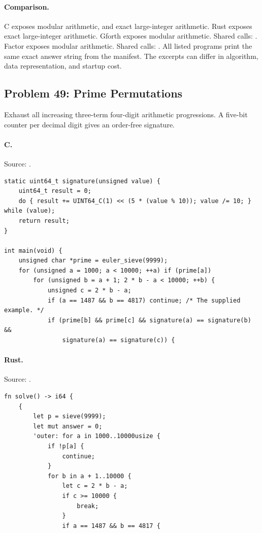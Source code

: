 \paragraph{Comparison.}
C exposes modular arithmetic, and exact large-integer arithmetic. Rust exposes exact large-integer arithmetic. Gforth exposes modular arithmetic. Shared calls: \texttt{}. Factor exposes modular arithmetic. Shared calls: \texttt{}.
All listed programs print the same exact answer string from the manifest. The excerpts can differ in algorithm, data representation, and startup cost.

\subsection{Problem 49: Prime Permutations}
\label{walkthrough:p49}
Exhaust all increasing three-term four-digit arithmetic progressions. A five-bit counter per decimal digit gives an order-free signature.

\paragraph{C.} Source: .
\begin{lstlisting}
static uint64_t signature(unsigned value) {
    uint64_t result = 0;
    do { result += UINT64_C(1) << (5 * (value % 10)); value /= 10; } while (value);
    return result;
}

int main(void) {
    unsigned char *prime = euler_sieve(9999);
    for (unsigned a = 1000; a < 10000; ++a) if (prime[a])
        for (unsigned b = a + 1; 2 * b - a < 10000; ++b) {
            unsigned c = 2 * b - a;
            if (a == 1487 && b == 4817) continue; /* The supplied example. */
            if (prime[b] && prime[c] && signature(a) == signature(b) &&
                signature(a) == signature(c)) {
\end{lstlisting}

\paragraph{Rust.} Source: .
\begin{lstlisting}
fn solve() -> i64 {
    {
        let p = sieve(9999);
        let mut answer = 0;
        'outer: for a in 1000..10000usize {
            if !p[a] {
                continue;
            }
            for b in a + 1..10000 {
                let c = 2 * b - a;
                if c >= 10000 {
                    break;
                }
                if a == 1487 && b == 4817 {
\end{lstlisting}

